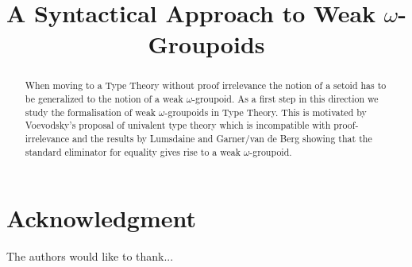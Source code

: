 \documentclass[a4paper]{article}
\begin{document}
\title{A Syntactical Approach to Weak $\omega$-Groupoids}


\maketitle


\begin{abstract}
  When moving to a Type Theory without proof irrelevance the notion of
  a setoid has to be generalized to the notion of a weak
  $\omega$-groupoid. As a first step in this direction we study the
  formalisation of weak $\omega$-groupoids in Type Theory. This is
  motivated by Voevodsky's proposal of univalent type theory which is
  incompatible with proof-irrelevance and the results by Lumsdaine and
  Garner/van de Berg showing that the standard eliminator for equality
  gives rise to a weak $\omega$-groupoid.
\end{abstract}

















  

\section*{Acknowledgment}


The authors would like to thank...


%
%


\end{document}
